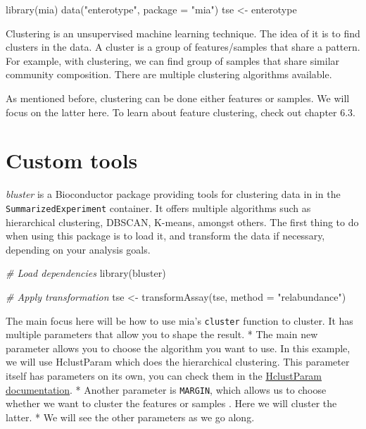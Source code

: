 \documentclass[
]{book}
\newenvironment{Shaded}{\begin{snugshade}}{\end{snugshade}}
\newcommand{\AttributeTok}[1]{\textcolor[rgb]{0.77,0.63,0.00}{#1}}
\newcommand{\CommentTok}[1]{\textcolor[rgb]{0.56,0.35,0.01}{\textit{#1}}}
\newcommand{\FunctionTok}[1]{\textcolor[rgb]{0.00,0.00,0.00}{#1}}
\newcommand{\NormalTok}[1]{#1}
\newcommand{\OtherTok}[1]{\textcolor[rgb]{0.56,0.35,0.01}{#1}}
\newcommand{\StringTok}[1]{\textcolor[rgb]{0.31,0.60,0.02}{#1}}
\begin{document}
\begin{Shaded}
\begin{Highlighting}[]
\FunctionTok{library}\NormalTok{(mia)}
\FunctionTok{data}\NormalTok{(}\StringTok{"enterotype"}\NormalTok{, }\AttributeTok{package =} \StringTok{"mia"}\NormalTok{)}
\NormalTok{tse }\OtherTok{\textless{}{-}}\NormalTok{ enterotype}
\end{Highlighting}
\end{Shaded}

Clustering is an unsupervised machine learning technique. The idea of
it is to find clusters in the data. A cluster is a group of
features/samples that share a pattern. For example, with clustering, we
can find group of samples that share similar community
composition. There are multiple clustering algorithms available.

As mentioned before, clustering can be done either features or samples.
We will focus on the latter here. To learn about feature clustering,
check out chapter 6.3.

\hypertarget{custom-tools}{%
\section{Custom tools}\label{custom-tools}}

\emph{bluster} is a Bioconductor package providing tools for clustering data in
in the \texttt{SummarizedExperiment} container. It offers multiple algorithms such
as hierarchical clustering, DBSCAN, K-means, amongst others. The first thing
to do when using this package is to load it, and transform the data if
necessary, depending on your analysis goals.

\begin{Shaded}
\begin{Highlighting}[]
\CommentTok{\# Load dependencies}
\FunctionTok{library}\NormalTok{(bluster)}

\CommentTok{\# Apply transformation}
\NormalTok{tse }\OtherTok{\textless{}{-}} \FunctionTok{transformAssay}\NormalTok{(tse, }\AttributeTok{method =} \StringTok{"relabundance"}\NormalTok{)}
\end{Highlighting}
\end{Shaded}

The main focus here will be how to use mia's \texttt{cluster} function to
cluster. It has multiple parameters that allow you to shape the result.
* The main new parameter allows you to choose the algorithm you want to use.
In this example, we will use HclustParam which does the hierarchical
clustering. This parameter itself has parameters on its own, you can check
them in the
\href{https://rdrr.io/github/LTLA/bluster/man/HclustParam-class.html}{HclustParam documentation}.
* Another parameter is \texttt{MARGIN}, which allows us to choose whether we want to
cluster the features or samples . Here we will cluster the latter.
* We will see the other parameters as we go along.
\end{document}

